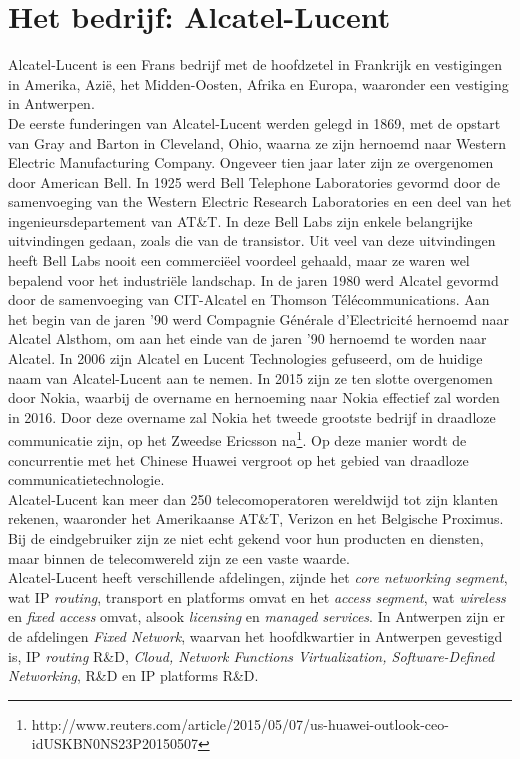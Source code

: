 \documentclass[10pt,a4paper]{article}
\begin{document}
\section{Het bedrijf: Alcatel-Lucent}
\label{bedrijf}
Alcatel-Lucent is een Frans bedrijf met de hoofdzetel in Frankrijk en vestigingen in Amerika, Azi\"e, het Midden-Oosten, Afrika en Europa, waaronder een vestiging in Antwerpen. \\
De eerste funderingen van Alcatel-Lucent werden gelegd in 1869, met de opstart van Gray and Barton in Cleveland, Ohio, waarna ze zijn hernoemd naar Western Electric Manufacturing Company. Ongeveer tien jaar later zijn ze overgenomen door American Bell. In 1925 werd Bell Telephone Laboratories gevormd door de samenvoeging van the Western Electric Research Laboratories en een deel van het ingenieursdepartement van AT\&T. In deze Bell Labs zijn enkele belangrijke uitvindingen gedaan, zoals die van de transistor. Uit veel van deze uitvindingen heeft Bell Labs nooit een commerci\"eel voordeel gehaald, maar ze waren wel bepalend voor het industri\"ele landschap. In de jaren 1980 werd Alcatel gevormd door de samenvoeging van CIT-Alcatel en Thomson T\'el\'ecommunications. Aan het begin van de jaren '90 werd Compagnie G\'en\'erale d'Electricit\'e hernoemd naar Alcatel Alsthom, om aan het einde van de jaren '90 hernoemd te worden naar Alcatel. In 2006 zijn Alcatel en Lucent Technologies gefuseerd, om de huidige naam van Alcatel-Lucent aan te nemen. In 2015 zijn ze ten slotte overgenomen door Nokia, waarbij de overname en hernoeming naar Nokia effectief zal worden in 2016. Door deze overname zal Nokia het tweede grootste bedrijf in draadloze communicatie zijn, op het Zweedse Ericsson na\footnote{http://www.reuters.com/article/2015/05/07/us-huawei-outlook-ceo-idUSKBN0NS23P20150507}. Op deze manier wordt de concurrentie met het Chinese Huawei vergroot op het gebied van draadloze communicatietechnologie.\\
Alcatel-Lucent kan meer dan 250 telecomoperatoren wereldwijd tot zijn klanten rekenen, waaronder het Amerikaanse AT\&T, Verizon en het Belgische Proximus. Bij de eindgebruiker zijn ze niet echt gekend voor hun producten en diensten, maar binnen de telecomwereld zijn ze een vaste waarde.\\
Alcatel-Lucent heeft verschillende afdelingen, zijnde het \textit{core networking segment}, wat IP \textit{routing}, transport en platforms omvat en het \textit{access segment}, wat \textit{wireless} en \textit{fixed access} omvat, alsook \textit{licensing} en \textit{managed services}. In Antwerpen zijn er de afdelingen \textit{Fixed Network}, waarvan het hoofdkwartier in Antwerpen gevestigd is, IP \textit{routing} R\&D, \textit{Cloud, Network Functions Virtualization, Software-Defined Networking}, R\&D en IP platforms R\&D.\\
\end{document}
